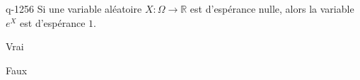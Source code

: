 \begin{truefalse}{q-1256}
Si une variable aléatoire $X : \Omega \to \mathbb{R}$ est d'espérance nulle, alors la variable $e^X$ est d'espérance $1$.
\item Vrai
\item* Faux
\end{truefalse}


